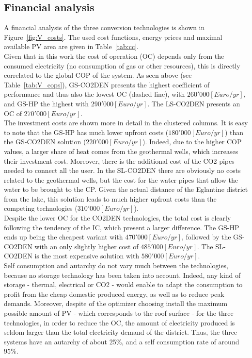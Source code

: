 \documentclass{article}
\begin{document}
\subsection{Financial analysis}
A financial analysis of the three conversion technologies is shown in Figure~\ref{fig:V_costs}. 
The used cost functions, energy prices and maximal available PV area are given in Table~\ref{tab:cc}. \\



Given that in this work the cost of operation (OC) depends only from the consumed electricity (no consumption of gas or other resources), this is directly correlated to the global COP of the system. As seen above (see Table~\ref{tab:V_cops}), GS-CO2DEN presents the highest coefficient of performance and thus also the lowest OC (dashed line), with $260'000[Euro/yr]$, and GS-HP the highest with $290'000[Euro/yr]$. The LS-CO2DEN presents an OC of $270'000[Euro/yr]$.\\

The investment costs are shown more in detail in the clustered columns. It is easy to note that the GS-HP has much lower upfront costs ($180'000[Euro/yr]$) than the GS-CO2DEN solution ($220'000[Euro/yr]$). Indeed, due to the higher COP values, a larger share of heat comes from the geothermal wells, which increases their investment cost. Moreover, there is the additional cost of the CO2 pipes needed to connect all the user. In the SL-CO2DEN there are obviously no costs related to the geothermal wells, but the cost for the water pipes that allow the water to be brought to the CP. Given the actual distance of the Eglantine district from the lake, this solution leads to much higher upfront costs than the competing technologies ($310'000[Euro/yr]$).\\

Despite the lower OC for the CO2DEN technologies, the total cost is clearly following the tendency of the IC, which present a larger difference. The GS-HP ends up being the cheapest variant with $470'000 [Euro/yr]$, followed by the GS-CO2DEN with an only slightly higher cost of $485'000 [Euro/yr]$. The SL-CO2DEN is the most expensive solution with $580'000 [Euro/yr]$.\\

Self consumption and autarchy do not vary much between the technologies, because no storage technology has been taken into account. Indeed, any kind of storage - thermal, electrical or CO2 - would enable to adapt the consumption to profit from the cheap domestic produced energy, as well as to reduce peak demands. Moreover, despite of the optimizer choosing install the maximum possible amount of PV - which corresponds to the roof surface - for the three technologies, in order to reduce the OC, the amount of electricity produced is seldom larger than the total electricity demand of the district. Thus, the three systems have an autarchy of about 25\%, and a self consumption rate of around 95\%.\\
\end{document}
